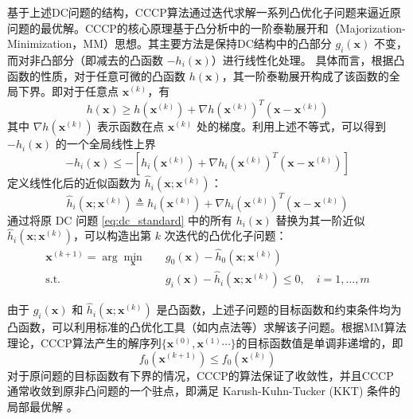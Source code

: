 基于上述DC问题的结构，CCCP算法通过迭代求解一系列凸优化子问题来逼近原问题的最优解。CCCP的核心原理基于凸分析中的一阶泰勒展开和（Majorization-Minimization，MM）思想。其主要方法是保持DC结构中的凸部分 $g_i(\mathbf{x})$ 不变，而对非凸部分（即减去的凸函数 $-h_i(\mathbf{x})$）进行线性化处理。
具体而言，根据凸函数的性质，对于任意可微的凸函数 $h(\mathbf{x})$，其一阶泰勒展开构成了该函数的全局下界。即对于任意点 $\mathbf{x}^{(k)}$，有
\begin{equation}
	h(\mathbf{x}) \geq h(\mathbf{x}^{(k)}) + \nabla h(\mathbf{x}^{(k)})^T (\mathbf{x} - \mathbf{x}^{(k)})
\end{equation}
其中 $\nabla h(\mathbf{x}^{(k)})$ 表示函数在点 $\mathbf{x}^{(k)}$ 处的梯度。利用上述不等式，可以得到 $-h_i(\mathbf{x})$ 的一个全局线性上界
\begin{equation}
	-h_i(\mathbf{x}) \leq -\left[ h_i(\mathbf{x}^{(k)}) + \nabla h_i(\mathbf{x}^{(k)})^T (\mathbf{x} - \mathbf{x}^{(k)}) \right]
\end{equation}
定义线性化后的近似函数为 $\hat{h}_i(\mathbf{x}; \mathbf{x}^{(k)})$：
\begin{equation}
	\hat{h}_i(\mathbf{x}; \mathbf{x}^{(k)}) \triangleq h_i(\mathbf{x}^{(k)}) + \nabla h_i(\mathbf{x}^{(k)})^T (\mathbf{x} - \mathbf{x}^{(k)})
\end{equation}
通过将原 DC 问题 \eqref{eq:dc_standard} 中的所有 $h_i(\mathbf{x})$ 替换为其一阶近似 $\hat{h}_i(\mathbf{x}; \mathbf{x}^{(k)})$，可以构造出第 $k$ 次迭代的凸优化子问题：
\begin{equation}
	\label{eq:cccp_subproblem}
	\begin{aligned}
		\mathbf{x}^{(k+1)} = \arg \min_{\mathbf{x}} \quad & g_0(\mathbf{x}) - \hat{h}_0(\mathbf{x}; \mathbf{x}^{(k)}) \\
		\text{s.t.} \quad & g_i(\mathbf{x}) - \hat{h}_i(\mathbf{x}; \mathbf{x}^{(k)}) \leq 0, \quad i = 1, \dots, m
	\end{aligned}
\end{equation}

由于 $g_i(\mathbf{x})$ 和 $\hat{h}_i(\mathbf{x}; \mathbf{x}^{(k)})$ 是凸函数，上述子问题的目标函数和约束条件均为凸函数，可以利用标准的凸优化工具（如内点法等）求解该子问题。根据MM算法理论，CCCP算法产生的解序列$\{\mathbf{x}^{(0)},\mathbf{x}^{(1)}\cdots\}$的目标函数值是单调非递增的，即
\begin{equation}
	f_0(\mathbf{x}^{(k+1)}) \leq f_0(\mathbf{x}^{(k)})
\end{equation}
对于原问题的目标函数有下界的情况，CCCP的算法保证了收敛性，并且CCCP 通常收敛到原非凸问题的一个驻点，即满足 Karush-Kuhn-Tucker (KKT) 条件的局部最优解 。

